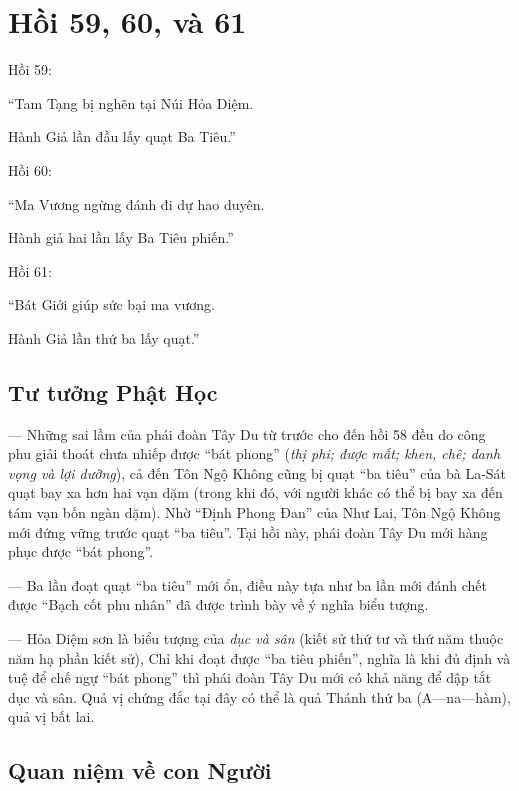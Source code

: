 \chapter{Hồi 59, 60, và 61} %
\label{cha:hoi_59_60}

Hồi 59:

\begin{itshape}
``Tam Tạng bị nghẽn tại Núi Hỏa Diệm.

Hành Giả lần đầu lấy quạt Ba Tiêu.''
\end{itshape}

Hồi 60:

\begin{itshape}
``Ma Vương ngừng đánh đi dự hao duyên.

Hành giả hai lần lấy Ba Tiêu phiến.''
\end{itshape}

Hồi 61:

\begin{itshape}
``Bát Giới giúp sức bại ma vương.

Hành Giả lần thứ ba lấy quạt.''
\end{itshape}

\section{Tư tưởng Phật Học} %
\label{sec:59_60_phat_hoc}

— Những sai lầm của phái đoàn Tây Du từ trước cho đến hồi 58 đều do công phu giải thoát chưa nhiếp được ``bát phong'' (\emph{thị phi; được mất; khen, chê; danh vọng và lợi dưỡng}), cả đến Tôn Ngộ Không cũng bị quạt ``ba tiêu'' của bà La-Sát quạt bay xa hơn hai vạn dặm (trong khi đó, với người khác có thể bị bay xa đến tám vạn bốn ngàn dặm). Nhờ ``Định Phong Đan'' của Như Lai, Tôn Ngộ Không mới đứng vững trước quạt ``ba tiêu''. Tại hồi này, phái đoàn Tây Du mới hàng phục được ``bát phong''.

— Ba lần đoạt quạt ``ba tiêu'' mới ổn, điều này tựa như ba lần mới đánh chết được ``Bạch cốt phu nhân'' đã được trình bày về ý nghĩa biểu tượng.

— Hỏa Diệm sơn là biểu tượng của \emph{dục và sân} (kiết sử thứ tư và thứ năm thuộc năm hạ phần kiết sử), Chỉ khi đoạt được ``ba tiêu phiến'', nghĩa là khi đủ định và tuệ để chế ngự ``bát phong'' thì phái đoàn Tây Du mới có khả năng để dập tắt dục và sân. Quả vị chứng đắc tại đây có thể là quả Thánh thứ ba (A—na—hàm), quả vị bất lai.

\section{Quan niệm về con Người} %
\label{sec:59_60_con_nguoi}


